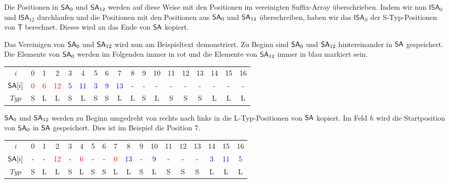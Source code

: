 Die Positionen in $\sa_0$ und $\sa_{12}$ werden auf diese Weise mit den Positionen im vereinigten Suffix-Array überschrieben. Indem wir nun $\mathsf{ISA}_0$ und $\mathsf{ISA}_{12}$ durchlaufen und die Positionen mit den Positionen aus $\sa_0$ und $\sa_{12}$ überschreiben, haben wir das $\mathsf{ISA}_S$ der S-Typ-Positionen von $\mathsf{T}$ berechnet. Dieses wird an das Ende von $\sa$ kopiert. \par
Das Vereinigen von $\sa_0$ und $\sa_{12}$ wird nun am Beispieltext demonstriert. Zu Beginn sind $\sa_0$ und $\sa_{12}$ hintereinander in $\sa$ gespeichert. Die Elemente von $\sa_0$ werden im Folgenden immer in rot und die Elemente von $\sa_{12}$ immer in blau markiert sein. 

\begin{table}[H]
	\footnotesize
	\centering
	\begin{tabular}{c| c c c c c c c c c c c c c c c c c}
		$i$ & 0 & 1 & 2 & 3 & 4 & 5 & 6 & 7 & 8 & 9 & 10 & 11 & 12 & 13 & 14 & 15 & 16 \\
		$\sa[i]$ & \textcolor{red}{0} & \textcolor{red}{6} & \textcolor{red}{12} & \textcolor{blue}{5} & \textcolor{blue}{11} & \textcolor{blue}{3} & \textcolor{blue}{9} & \textcolor{blue}{13} & - & - & - & - & - & - & - & - & - \\
		$Typ$ & S & L & L & S & L & S & S & L & L & S & L & S & S & S & L & L & L
	\end{tabular}
\end{table}

$\sa_0$ und $\sa_{12}$ werden zu Beginn umgedreht von rechts nach links in die L-Typ-Positionen von $\sa$ kopiert. Im Feld $h$ wird die Startposition von $\sa_0$ in $\sa$ gespeichert. Dies ist im Beispiel die Position $7$.

\begin{table}[H]
	\footnotesize
	\centering
	\begin{tabular}{c| c c c c c c c c c c c c c c c c c}
		$i$ & 0 & 1 & 2 & 3 & 4 & 5 & 6 & 7 & 8 & 9 & 10 & 11 & 12 & 13 & 14 & 15 & 16 \\
		$\sa[i]$ & - & - & \textcolor{red}{12} & - & \textcolor{red}{6} & - & - & \textcolor{red}{0} & \textcolor{blue}{13} & - & \textcolor{blue}{9} & - & - & - & \textcolor{blue}{3} & \textcolor{blue}{11} & \textcolor{blue}{5} \\
		$Typ$ & S & L & L & S & L & S & S & L & L & S & L & S & S & S & L & L & L
	\end{tabular}
\end{table}

